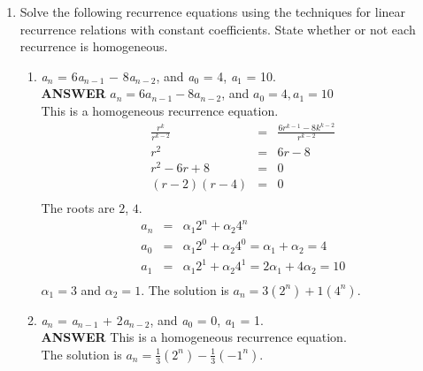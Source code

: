 \documentclass{article}
\begin{document}
\begin{enumerate}
\item
 Solve the following recurrence equations using the techniques
for linear recurrence relations with constant coefficients. State
whether or not each recurrence is homogeneous.\\
\begin{enumerate}
\item
\textit{a}$_{\mathit{n}}$ = 6\textit{a}$_{\mathit{n-1}}$
\ensuremath{-} 8\textit{a}$_{\mathit{n-2}}$, and
\textit{a}$_{\mathit{0}}$
= 4, \textit{a}$_{\mathit{1}}$ = 10.\\
\vskip 10pt  \textbf{ANSWER}
$a_n = 6a_{n-1} - 8a_{n-2}$, and $a_0 = 4, a_1 = 10$\\
This is a homogeneous recurrence equation.          \\
\begin{eqnarray*}
\frac{r^k} {r^{k-2}} &=& \frac{6r^{k-1} - 8k^{k-2}} {r^{k-2}}   \\
r^2 & = & 6r - 8                        \\
r^2 -6r + 8 & = & 0                     \\
(r - 2)(r - 4)  & = & 0                     \\
\end{eqnarray*}
The roots are $2$, $4$.
\begin{eqnarray*}
a_n & = & \alpha_1 2^n + \alpha_2 4^n               \\
a_0  & = & \alpha_1 2^0 +  \alpha_2 4^0 = \alpha_1 + \alpha_2 = 4 \\
a_1  & = & \alpha_1 2^1 + \alpha_2 4^1 = 2 \alpha_1 + 4 \alpha_2 = 10 \\
\end{eqnarray*}
$\alpha_1  = 3$ and $\alpha_2 = 1$. The solution is $a_n = 3(2^n)
+ 1(4^n)$.
\item
\textit{a}$_{\mathit{n}}$ = \textit{a}$_{\mathit{n-1}}$ +
2\textit{a}$_{\mathit{n-2}}$, and \textit{a}$_{\mathit{0}}$
= 0, \textit{a}$_{\mathit{1}}$ = 1.\\
\vskip 10pt  \textbf{ANSWER} This is a homogeneous recurrence
equation.
\\The solution is $a_n = \frac{1}{3}(2^n) - \frac{1}{3}(-1^n)$.


\end{enumerate}
\end{enumerate}
\end{document}
